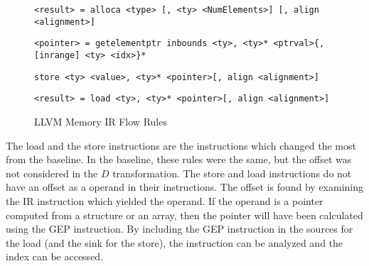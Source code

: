 \begin{figure}[h!]
  \hrulefill
  \begin{lstlisting}[style=nolinenumberstyle]
<result> = alloca <type> [, <ty> <NumElements>] [, align <alignment>]
  \end{lstlisting}


  \begin{lstlisting}[style=nolinenumberstyle]
<pointer> = getelementptr inbounds <ty>, <ty>* <ptrval>{, [inrange] <ty> <idx>}*
  \end{lstlisting}


  \begin{lstlisting}[style=nolinenumberstyle]
store <ty> <value>, <ty>* <pointer>[, align <alignment>]
  \end{lstlisting}


  \begin{lstlisting}[style=nolinenumberstyle]
<result> = load <ty>, <ty>* <pointer>[, align <alignment>]
  \end{lstlisting}

  \hrulefill
  \caption{LLVM Memory IR Flow Rules}
  \label{fig:llvm-mem-ir}
\end{figure}

The load and the store instructions are the instructions which changed the most
from the baseline. In the baseline, these rules were the same, but the offset
was not considered in the $D$ transformation. The store and load instructions do
not have an offset as a operand in their instructions. The offset is found  by
examining the IR instruction which yielded the operand. If the operand is a pointer
computed from a structure or an array, then the pointer will have
been calculated using the GEP instruction. By including the GEP instruction in
the sources for the load (and the sink for the store), the instruction can be
analyzed and the index can be accessed.


